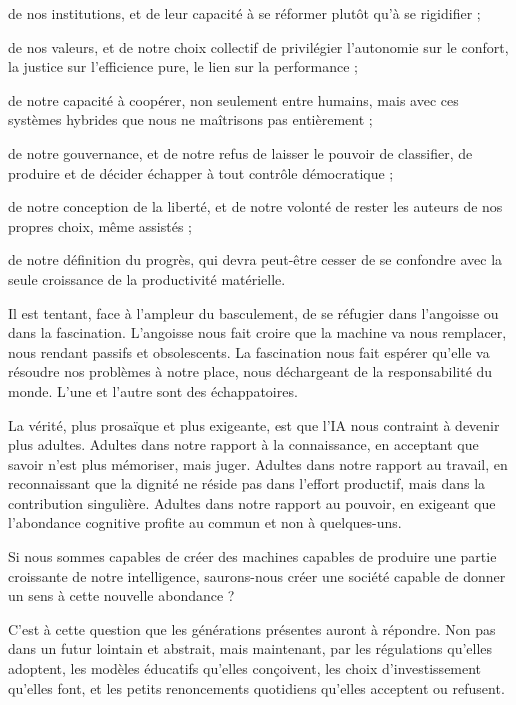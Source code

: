 \begin{eplist}
\item de nos institutions, et de leur capacité à se réformer plutôt qu'à se rigidifier ;
\item de nos valeurs, et de notre choix collectif de privilégier l'autonomie sur le confort, la justice sur l'efficience pure, le lien sur la performance ;
\item de notre capacité à coopérer, non seulement entre humains, mais avec ces systèmes hybrides que nous ne maîtrisons pas entièrement ;
\item de notre gouvernance, et de notre refus de laisser le pouvoir de classifier, de produire et de décider échapper à tout contrôle démocratique ;
\item de notre conception de la liberté, et de notre volonté de rester les auteurs de nos propres choix, même assistés ;
\item de notre définition du progrès, qui devra peut-être cesser de se confondre avec la seule croissance de la productivité matérielle.
\end{eplist}
Il est tentant, face à l'ampleur du basculement, de se réfugier dans l'angoisse ou dans la fascination. L'angoisse nous fait croire que la machine va nous remplacer, nous rendant passifs et obsolescents. La fascination nous fait espérer qu'elle va résoudre nos problèmes à notre place, nous déchargeant de la responsabilité du monde. L'une et l'autre sont des échappatoires.

La vérité, plus prosaïque et plus exigeante, est que l'IA nous contraint à devenir plus adultes. Adultes dans notre rapport à la connaissance, en acceptant que savoir n'est plus mémoriser, mais juger. Adultes dans notre rapport au travail, en reconnaissant que la dignité ne réside pas dans l'effort productif, mais dans la contribution singulière. Adultes dans notre rapport au pouvoir, en exigeant que l'abondance cognitive profite au commun et non à quelques-uns.

\begin{aiquote}[s]
\qbold Si nous sommes capables de créer des machines capables de produire une partie croissante de notre intelligence, saurons-nous créer une société capable de donner un sens à cette nouvelle abondance ?
\end{aiquote}

C'est à cette question que les générations présentes auront à répondre. Non pas dans un futur lointain et abstrait, mais maintenant, par les régulations qu'elles adoptent, les modèles éducatifs qu'elles conçoivent, les choix d'investissement qu'elles font, et les petits renoncements quotidiens qu'elles acceptent ou refusent.

